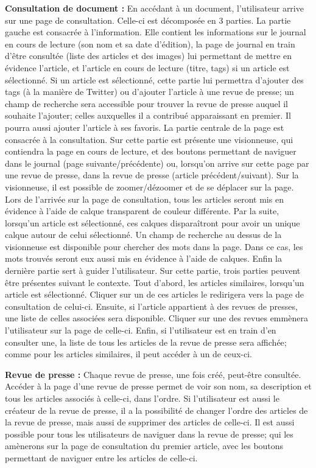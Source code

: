 	\textbf{Consultation de document :} En accédant à un document, l'utilisateur arrive sur une page de consultation. Celle-ci est décomposée en 3 parties. La partie gauche est consacrée à l'information. Elle contient les informations sur le journal en cours de lecture (son nom et sa date d'édition), la page de journal en train d'être consultée (liste des articles et des images) lui permettant de mettre en évidence l'article, et l'article en cours de lecture (titre, tags) si un article est sélectionné. Si un article est sélectionné, cette partie lui permettra d'ajouter des tags (à la manière de Twitter) ou d'ajouter l'article à une revue de presse; un champ de recherche sera accessible pour trouver la revue de presse auquel il souhaite l'ajouter; celles auxquelles il a contribué apparaissant en premier. Il pourra aussi ajouter l'article à ses favoris. La partie centrale de la page est consacrée à la consultation. Sur cette partie est présente une visionneuse, qui contiendra la page en cours de lecture, et des boutons permettant de naviguer dans le journal (page suivante/précédente) ou, lorsqu'on arrive sur cette page par une revue de presse, dans la revue de presse (article précédent/suivant). Sur la visionneuse, il est possible de zoomer/dézoomer et de se déplacer sur la page. Lors de l'arrivée sur la page de consultation, tous les articles seront mis en évidence à l'aide de calque transparent de couleur différente. Par la suite, lorsqu'un article est sélectionné, ces calques disparaîtront pour avoir un unique calque autour de celui sélectionné. Un champ de recherche au dessus de la visionneuse est disponible pour chercher des mots dans la page. Dans ce cas, les mots trouvés seront eux aussi mis en évidence à l'aide de calques. Enfin la dernière partie sert à guider l'utilisateur. Sur cette partie, trois parties peuvent être présentes suivant le contexte. Tout d'abord, les articles similaires, lorsqu'un article est sélectionné. Cliquer sur un de ces articles le redirigera vers la page de consultation de celui-ci. Ensuite, si l'article appartient à des revues de presses, une liste de celles associées sera disponible. Cliquer sur une des revues emmènera l'utilisateur sur la page de celle-ci. Enfin, si l'utilisateur est en train d'en consulter une, la liste de tous les articles de la revue de presse sera affichée; comme pour les articles similaires, il peut accéder à un de ceux-ci.

	\textbf{Revue de presse :} Chaque revue de presse, une fois créé, peut-être consultée. Accéder à la page d'une revue de presse permet de voir son nom, sa description et tous les articles associés à celle-ci, dans l'ordre. Si l'utilisateur est aussi le créateur de la revue de presse, il a la possibilité de changer l'ordre des articles de la revue de presse, mais aussi de supprimer des articles de celle-ci. Il est aussi possible pour tous les utilisateurs de naviguer dans la revue de presse; qui les amènerons sur la page de consultation du premier article, avec les boutons permettant de naviguer entre les articles de celle-ci.

